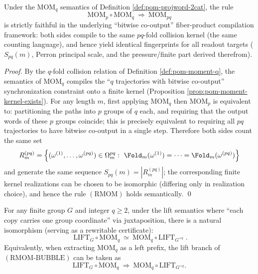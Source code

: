 \begin{proposition}\label{prop:pom-rmom-sound}
Under the \(\mathrm{MOM}_q\) semantics of Definition \ref{def:pom-projword-2cat}, the rule
\[
\mathrm{MOM}_p\circ \mathrm{MOM}_q\ \Rightarrow\ \mathrm{MOM}_{pq}
\]
is strictly faithful in the underlying ``bitwise co-output'' fiber-product compilation framework: both sides compile to the same \(pq\)-fold collision kernel (the same counting language), and hence yield identical fingerprints for all readout targets (\(S_{pq}(m)\), Perron principal scale, and the pressure/finite part derived therefrom).
\end{proposition}

\begin{proof}
By the \(q\)-fold collision relation of Definition \ref{def:pom-moment-q}, the semantics of \(\mathrm{MOM}_q\) compiles the ``\(q\) trajectories with bitwise co-output'' synchronization constraint onto a finite kernel (Proposition \ref{prop:pom-moment-kernel-exists}).
For any length \(m\), first applying \(\mathrm{MOM}_q\) then \(\mathrm{MOM}_p\) is equivalent to: partitioning the paths into \(p\) groups of \(q\) each, and requiring that the output words of these \(p\) groups coincide; this is precisely equivalent to requiring all \(pq\) trajectories to have bitwise co-output in a single step.
Therefore both sides count the same set
\[
R_m^{(pq)}=\Bigl\{(\omega^{(1)},\dots,\omega^{(pq)})\in\Omega_m^{pq}:\ \Fold_m(\omega^{(1)})=\cdots=\Fold_m(\omega^{(pq)})\Bigr\}
\]
and generate the same sequence \(S_{pq}(m)=|R_m^{(pq)}|\); the corresponding finite kernel realizations can be chosen to be isomorphic (differing only in realization choice), and hence the rule \((\mathrm{RMOM})\) holds semantically. \qed
\end{proof}

\begin{proposition}\label{prop:pom-mom-lift-beck-chevalley}
For any finite group \(G\) and integer \(q\ge 2\), under the lift semantics where ``each copy carries one group coordinate'' via juxtaposition, there is a natural isomorphism (serving as a rewritable certificate):
\[
\boxed{\;
\mathrm{LIFT}_G\circ \mathrm{MOM}_q\ \simeq\ \mathrm{MOM}_q\circ \mathrm{LIFT}_{G^{\times q}}\; }.
\]
Equivalently, when extracting \(\mathrm{MOM}_q\) as a left prefix, the lift branch of \((\mathrm{RMOM\text{-}BUBBLE})\) can be taken as
\[
\mathrm{LIFT}_G\circ \mathrm{MOM}_q\ \Rightarrow\ \mathrm{MOM}_q\circ \mathrm{LIFT}_{G^{\times q}}.
\]
\end{proposition}

